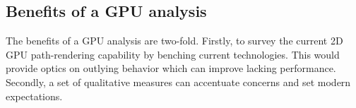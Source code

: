 \subsection{Benefits of a GPU analysis}

The benefits of a GPU analysis are two-fold. Firstly, to survey the current 2D GPU path-rendering capability by benching current technologies. This would provide optics on outlying behavior which can improve lacking performance. Secondly, a set of qualitative measures can accentuate concerns and set modern expectations.
